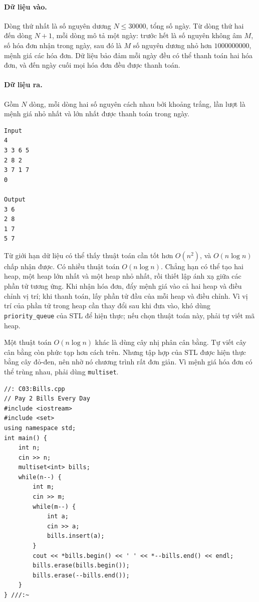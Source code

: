 \documentclass[11pt]{article}
\begin{document}
\paragraph{Dữ liệu vào.}
Dòng thứ nhất là số nguyên dương \(N\le 30000\), tổng số ngày. Từ dòng thứ
hai đến dòng \(N+1\), mỗi dòng mô tả một ngày: trước hết là số nguyên không âm
\(M\), số hóa đơn nhận trong ngày, sau đó là \(M\) số nguyên dương nhỏ hơn
\(1000000000\), mệnh giá các hóa đơn. Dữ liệu bảo đảm mỗi ngày đều có thể
thanh toán hai hóa đơn, và đến ngày cuối mọi hóa đơn đều được thanh toán.

\paragraph{Dữ liệu ra.}
Gồm \(N\) dòng, mỗi dòng hai số nguyên cách nhau bởi khoảng trắng, lần lượt là
mệnh giá nhỏ nhất và lớn nhất được thanh toán trong ngày.

\begin{verbatim}
Input
4
3 3 6 5
2 8 2
3 7 1 7
0

Output
3 6
2 8
1 7
5 7
\end{verbatim}

Từ giới hạn dữ liệu có thể thấy thuật toán cần tốt hơn \(O(n^2)\), và
\(O(n\log n)\) chấp nhận được. Có nhiều thuật toán \(O(n\log n)\). Chẳng hạn
có thể tạo hai heap, một heap lớn nhất và một heap nhỏ nhất, rồi thiết lập ánh
xạ giữa các phần tử tương ứng. Khi nhận hóa đơn, đẩy mệnh giá vào cả hai heap
và điều chỉnh vị trí; khi thanh toán, lấy phần tử đầu của mỗi heap và điều
chỉnh. Vì vị trí của phần tử trong heap cần thay đổi sau khi đưa vào, khó
dùng \verb|priority_queue| của STL để hiện thực; nếu chọn thuật toán này,
phải tự viết mã heap.

Một thuật toán \(O(n\log n)\) khác là dùng cây nhị phân cân bằng. Tự viết cây
cân bằng còn phức tạp hơn cách trên. Nhưng tập hợp của STL được hiện thực
bằng cây đỏ-đen, nên nhờ nó chương trình rất đơn giản. Vì mệnh giá hóa đơn có
thể trùng nhau, phải dùng \verb|multiset|.

\begin{verbatim}
//: C03:Bills.cpp
// Pay 2 Bills Every Day
#include <iostream>
#include <set>
using namespace std;
int main() {
    int n;
    cin >> n;
    multiset<int> bills;
    while(n--) {
        int m;
        cin >> m;
        while(m--) {
            int a;
            cin >> a;
            bills.insert(a);
        }
        cout << *bills.begin() << ' ' << *--bills.end() << endl;
        bills.erase(bills.begin());
        bills.erase(--bills.end());
    }
} ///:~
\end{verbatim}
\end{document}
